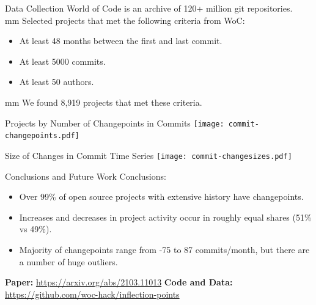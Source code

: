 \documentclass[11pt,handout]{beamer}
\begin{document}
\begin{frame}{Data Collection}
World of Code is an archive of 120+ million git repositories.\\
 mm
Selected projects that met the following criteria from WoC:
    \begin{itemize}
        \item At least 48 months between the first and last commit.
        \item At least 5000 commits.
        \item At least 50 authors.
    \end{itemize}
 mm
We found 8,919 projects that met these criteria.
\end{frame}

%
\begin{frame}{Projects by Number of Changepoints in Commits}
    \texttt{[image: commit-changepoints.pdf]}
\end{frame}

%
%
\begin{frame}{Size of Changes in Commit Time Series}
    \texttt{[image: commit-changesizes.pdf]}
\end{frame}

\begin{frame}{Conclusions and Future Work}
    Conclusions:
    \begin{itemize}
        \item Over 99\% of open source projects with extensive history have changepoints.
        \item Increases and decreases in project activity occur in roughly equal shares (51\% vs 49\%).
        \item Majority of changepoints range from -75 to 87 commits/month, but there are a number of huge outliers.
    \end{itemize}
    \vskip 5mm
    \textbf{Paper:} \url{https://arxiv.org/abs/2103.11013}
    \vskip 5mm
    \textbf{Code and Data:} \url{https://github.com/woc-hack/inflection-points}
    \vskip 5mm
\end{frame}
\end{document}
